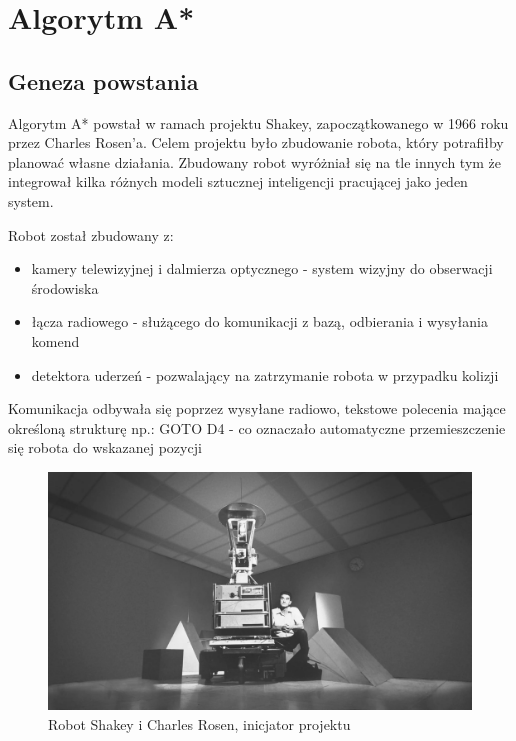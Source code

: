 \section{Algorytm A*}
\subsection{Geneza powstania}
Algorytm A* powstał w ramach projektu Shakey, zapoczątkowanego w 1966 roku przez Charles Rosen'a.
Celem projektu było zbudowanie robota, który potrafiłby planować własne działania. 
Zbudowany robot wyróżniał się na tle innych tym że integrował kilka różnych modeli sztucznej 
inteligencji pracującej jako jeden system.

Robot został zbudowany z:
\begin{itemize}
	\item kamery telewizyjnej i dalmierza optycznego - system wizyjny do obserwacji środowiska
	\item łącza radiowego - służącego do komunikacji z bazą, odbierania i wysyłania komend
	\item detektora uderzeń - pozwalający na zatrzymanie robota w przypadku kolizji
\end{itemize}

Komunikacja odbywała się poprzez wysyłane radiowo, tekstowe polecenia mające określoną strukturę np.:
GOTO D4 - co oznaczało automatyczne przemieszczenie się robota do wskazanej pozycji
\begin{figure}[H]
	\centering
	\includegraphics[width=14cm]{pages/algorytm/zdjecia/shakey2.jpg}
	\caption{Robot Shakey i Charles Rosen, inicjator projektu \cite{robotShakey}}
	\label{fig:Rys}
\end{figure}


